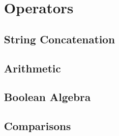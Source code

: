 \chapter{Operators}

\section{String Concatenation}

\section{Arithmetic}

\section{Boolean Algebra}

\section{Comparisons}